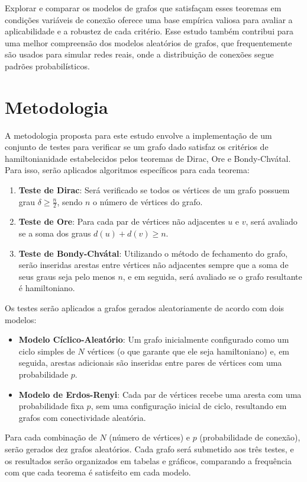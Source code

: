 \documentclass[12pt, openright, oneside, a4paper, chapter=TITLE, section=TITLE, subsection=TITLE, subsubsection=TITLE, brazil]{abntex2}
\begin{document}
Explorar e comparar os modelos de grafos que satisfaçam esses teoremas em condições variáveis de conexão oferece uma base empírica valiosa para avaliar a aplicabilidade e a robustez de cada critério. Esse estudo também contribui para uma melhor compreensão dos modelos aleatórios de grafos, que frequentemente são usados para simular redes reais, onde a distribuição de conexões segue padrões probabilísticos.

\section{Metodologia}
A metodologia proposta para este estudo envolve a implementação de um conjunto de testes para verificar se um grafo dado satisfaz os critérios de hamiltonianidade estabelecidos pelos teoremas de Dirac, Ore e Bondy-Chvátal. Para isso, serão aplicados algoritmos específicos para cada teorema:
\begin{enumerate}
    \item \textbf{Teste de Dirac}: Será verificado se todos os vértices de um grafo possuem grau $\delta \geq \frac{n}{2}$, sendo $n$ o número de vértices do grafo.
    \item \textbf{Teste de Ore}: Para cada par de vértices não adjacentes $u$ e $v$, será avaliado se a soma dos graus $d(u) + d(v) \geq n$.
    \item \textbf{Teste de Bondy-Chvátal}: Utilizando o método de fechamento do grafo, serão inseridas arestas entre vértices não adjacentes sempre que a soma de seus graus seja pelo menos $n$, e em seguida, será avaliado se o grafo resultante é hamiltoniano.
\end{enumerate}
Os testes serão aplicados a grafos gerados aleatoriamente de acordo com dois modelos:
\begin{itemize}
    \item \textbf{Modelo Cíclico-Aleatório}: Um grafo inicialmente configurado como um ciclo simples de $N$ vértices (o que garante que ele seja hamiltoniano) e, em seguida, arestas adicionais são inseridas entre pares de vértices com uma probabilidade $p$.
    \item \textbf{Modelo de Erdos-Renyi}: Cada par de vértices recebe uma aresta com uma probabilidade fixa $p$, sem uma configuração inicial de ciclo, resultando em grafos com conectividade aleatória.
\end{itemize}
Para cada combinação de $N$ (número de vértices) e $p$ (probabilidade de conexão), serão gerados dez grafos aleatórios. Cada grafo será submetido aos três testes, e os resultados serão organizados em tabelas e gráficos, comparando a frequência com que cada teorema é satisfeito em cada modelo.
\end{document}
